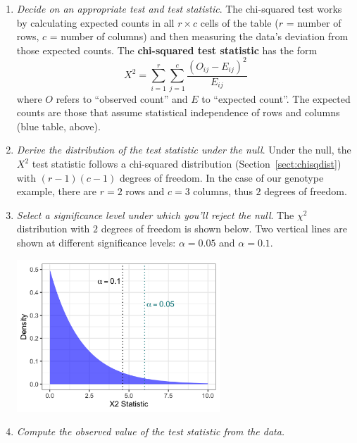 \begin{enumerate}
\item \textit{Decide on an appropriate test and test statistic}. The chi-squared test works by calculating expected counts in all $r \times c$ cells of the table ($r$ = number of rows, $c$ = number of columns) and then measuring the data's deviation from those expected counts. The \textbf{chi-squared test statistic} has the form
$$ X^2 = \sum_{i=1}^r \sum_{j=1}^c \frac{(O_{ij} - E_{ij})^2}{E_{ij}} $$
where $O$ refers to ``observed count'' and $E$ to ``expected count''. The expected counts are those that assume statistical independence of rows and columns (blue table, above).

\item \textit{Derive the distribution of the test statistic under the null}. Under the null, the $X^2$ test statistic follows a chi-squared distribution (Section~\ref{sect:chisqdist}) with $(r-1)(c-1)$ degrees of freedom. In the case of our genotype example, there are $r=2$ rows and $c=3$ columns, thus $2$ degrees of freedom.

\item \textit{Select a {significance level} under which you'll reject the null}. The $\chi^2$ distribution with $2$ degrees of freedom is shown below. Two vertical lines are shown at different significance levels: $\alpha = 0.05$ and $\alpha = 0.1$.

\begin{center}
\includegraphics[width=0.6\textwidth]{img/hyp-chisq-test-example-2.png} 
\end{center}

\item \textit{Compute the observed value of the test statistic from the data.}


\end{enumerate}
